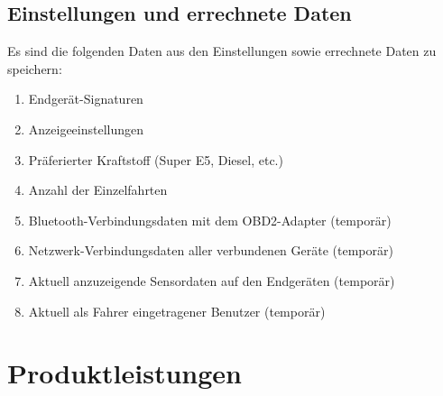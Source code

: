 \documentclass[pflichtenheft.tex]{subfiles}
\begin{document}
\section{Einstellungen und errechnete Daten}
Es sind die folgenden Daten aus den Einstellungen sowie errechnete Daten zu speichern:

\begin{enumerate}
\setcounter{enumi}{\value{enumTemp}}
\item Endgerät-Signaturen
\item Anzeigeeinstellungen
\item Präferierter Kraftstoff (Super E5, Diesel, etc.)
\item Anzahl der Einzelfahrten
\item Bluetooth-Verbindungsdaten mit dem OBD2-Adapter (temporär)
\item Netzwerk-Verbindungsdaten aller verbundenen Geräte (temporär) 
\item Aktuell anzuzeigende Sensordaten auf den Endgeräten (temporär)
\item Aktuell als Fahrer eingetragener Benutzer (temporär)
\setcounter{enumTemp}{\value{enumi}}
\end{enumerate}


\setcounter{enumTemp}{\value{enumi}}

\chapter{Produktleistungen}

\renewcommand{\theenumi}{/PL\ifnum \value{enumi}<10 0\fi\arabic{enumi}0/}
\renewcommand{\labelenumi}{\theenumi}
\renewcommand{\theenumii}{\arabic{enumii}}
\renewcommand{\labelenumii}{PL\ifnum \value{enumi}<10 0\fi\arabic{enumi}\arabic{enumii}/}
\end{document}
